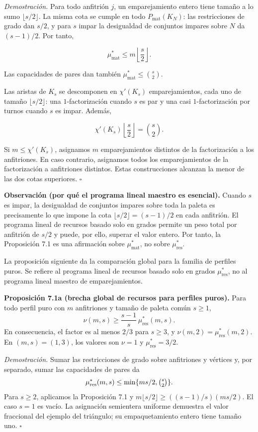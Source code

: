 \documentclass[spanish,11pt,a4paper]{article}
\begin{document}
\emph{Demostración.} Para todo anfitrión \(j\), un emparejamiento entero
tiene tamaño a lo sumo \(\lfloor s/2\rfloor\). La misma cota se cumple
en todo \(P_{\mathrm{mat}}(K_N)\): las restricciones de grado dan
\(s/2\), y para \(s\) impar la desigualdad de conjuntos impares sobre
\(N\) da \((s-1)/2\). Por tanto,

\[
\mu^*_{\mathrm{mat}}
\le
m\left\lfloor\frac{s}{2}\right\rfloor.
\]

Las capacidades de pares dan también
\(\mu^*_{\mathrm{mat}}\le\binom{s}{2}\).

Las aristas de \(K_s\) se descomponen en \(\chi'(K_s)\) emparejamientos,
cada uno de tamaño \(\lfloor s/2\rfloor\): una \(1\)-factorización
cuando \(s\) es par y una casi \(1\)-factorización por turnos cuando
\(s\) es impar. Además,

\[
\chi'(K_s)\left\lfloor\frac{s}{2}\right\rfloor
=
\binom{s}{2}.
\]

Si \(m\le\chi'(K_s)\), asignamos \(m\) emparejamientos distintos de la
factorización a los anfitriones. En caso contrario, asignamos todos los
emparejamientos de la factorización a anfitriones distintos. Estas
construcciones alcanzan la menor de las dos cotas superiores.
\(\square\)

\textbf{Observación (por qué el programa lineal maestro es esencial).}
Cuando \(s\) es impar, la desigualdad de conjuntos impares sobre toda la
paleta es precisamente lo que impone la cota
\(\lfloor s/2\rfloor=(s-1)/2\) en cada anfitrión. El programa lineal de
recursos basado solo en grados permite un peso total por anfitrión de
\(s/2\) y puede, por ello, superar el valor entero. Por tanto, la
Proposición 7.1 es una afirmación sobre \(\mu^*_{\mathrm{mat}}\), no
sobre \(\mu^*_{\mathrm{res}}\).

La proposición siguiente da la comparación global para la familia de
perfiles puros. Se refiere al programa lineal de recursos basado solo en
grados \(\mu^*_{\mathrm{res}}\), no al programa lineal maestro de
emparejamientos.

\textbf{Proposición 7.1a (brecha global de recursos para perfiles
puros).} Para todo perfil puro con \(m\) anfitriones y tamaño de paleta
común \(s\ge1\), \[
\nu(m,s)\ge\frac{s-1}{s}\,\mu^*_{\mathrm{res}}(m,s).
\] En consecuencia, el factor es al menos \(2/3\) para \(s\ge3\), y
\(\nu(m,2)=\mu^*_{\mathrm{res}}(m,2)\). En \((m,s)=(1,3)\), los valores
son \(\nu=1\) y \(\mu^*_{\mathrm{res}}=3/2\).

\emph{Demostración.} Sumar las restricciones de grado sobre anfitriones
y vértices y, por separado, sumar las capacidades de pares da \[
\mu^*_{\mathrm{res}}(m,s)\le\min\{ms/2,\tbinom{s}{2}\}.
\] Para \(s\ge2\), aplicamos la Proposición 7.1 y
\(m\lfloor s/2\rfloor\ge((s-1)/s)(ms/2)\). El caso \(s=1\) es vacío. La
asignación semientera uniforme demuestra el valor fraccional del ejemplo
del triángulo; su empaquetamiento entero tiene tamaño uno. \(\square\)
\end{document}

